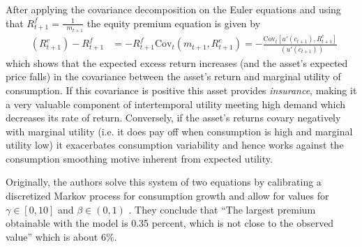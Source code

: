 After applying the covariance decomposition on the Euler equations and using that $R_{t+1}^{f} = \frac{1}{\mathop{\mathbb{E}_{t}}m_{t+1}}$ the equity premium equation is given by
\begin{align*}
    \mathop{\mathbb{E}_{t}} (R_{t+1}^{e}) - R_{t+1}^{f} &= -R_{t+1}^{f}\text{Cov}_{t}(m_{t+1}, R_{t+1}^{e}) = -\frac{\text{Cov}_{t}[u'(c_{t+1}), R_{t+1}^{e}]}{\mathop{\mathbb{E}_{t}}(u'(c_{t+1}))} 
\end{align*}
which shows that the expected excess return increases (and the asset's expected price falls) in the covariance between the asset's return and marginal utility of consumption. If this covariance is positive this asset provides \textit{insurance}, making it a very valuable component of intertemporal utility meeting high demand which decreases its rate of return. Conversely, if the asset's returns covary negatively with marginal utility (i.e. it does pay off when consumption is high and marginal utility low) it exacerbates consumption variability and hence works against the consumption smoothing motive inherent from expected utility.

Originally, the authors solve this system of two equations by calibrating a discretized Markov process \cite{Tauchen1986} for consumption growth and allow for values for $\gamma \in [0,10]$ and $\beta \in (0,1)$ . They conclude that ``The largest premium obtainable with the model is 0.35 percent, which is not close to the observed value'' \cite{Mehra1985} which is about 6\%.

